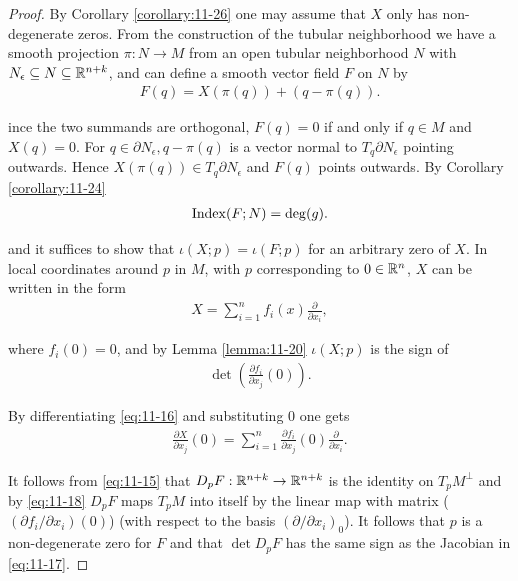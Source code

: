 \begin{proof}
  By Corollary \ref{corollary:11-26} one may assume that $X$ only has non-degenerate zeros.
From the construction of the tubular neighborhood we have a smooth projection
$\pi: N\to M$ from an open tubular neighborhood $N$ with $N_\epsilon\subseteq N\subseteq {\ensuremath{\mathbb{R}}}^{n+k}$, and 
can define a smooth vector field $F$ on $N$ by
\begin{align}\label{eq:11-15}
  F(q) = X(\pi(q)) + (q - \pi(q)).
\end{align}

ince the two summands are orthogonal, $F(q) = 0$ if and only if $q\in M$ and
$X(q) = 0$. For $q\in\partial N_\epsilon, q-\pi(q)$ is a vector normal to $T_q\partial N_\epsilon$ 
pointing outwards. Hence $X(\pi(q))\in T_q\partial N_\epsilon$ and $F(q)$ points outwards. 
By Corollary \ref{corollary:11-24} 
\begin{align*}
  \mathrm{Index}(F; N) = \mathrm{deg}(g).
\end{align*}

and it suffices to show that $\iota(X; p) = \iota(F; p)$ for an arbitrary zero of $X$. In 
local coordinates around $p$ in $M$, with $p$ corresponding to $0\in{\ensuremath{\mathbb{R}}}^n$, $X$ can be written
in the form
\begin{align}\label{eq:11-16}
  X = \sum_{i=1}^{n}{f_i(x) \frac{\partial }{\partial x_i }},
\end{align}

where $f_i(0) = 0$, and by Lemma \ref{lemma:11-20} $\iota(X; p)$ is the sign of 
\begin{align}\label{eq:11-17}
  \det\left(\frac{\partial f_i }{\partial x_j }(0)\right).
\end{align}

By differentiating \eqref{eq:11-16} and substituting 0 one gets
\begin{align}\label{eq:11-18}
  \frac{\partial X }{\partial x_j }(0) 
  = \sum_{i=1 }^{n }{\frac{\partial f_i }{\partial x_j }(0) \frac{\partial }{\partial x_i }}.
\end{align}

It follows from \eqref{eq:11-15} that $D_pF:{\mathbb{R}}^{n+k}\to{\ensuremath{\mathbb{R}}}^{n+k}$ is the identity 
on $T_pM^\perp$ and by \eqref{eq:11-18} $D_pF$ maps $T_pM$ into itself by the linear map with 
matrix ($(\partial f_i/\partial x_i)(0)$) (with respect to the basis $(\partial/\partial x_i)_0$). 
It follows that $p$ is a non-degenerate zero for $F$ and that $\det D_pF$ has the same sign as 
the Jacobian in \eqref{eq:11-17}.
\end{proof}